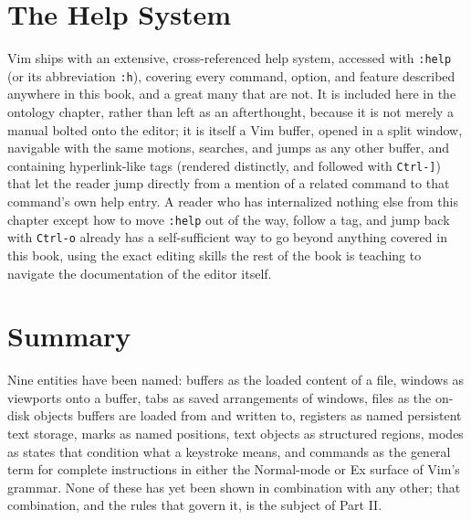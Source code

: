 \section{The Help System}

Vim ships with an extensive, cross-referenced help system, accessed with \texttt{:help} (or its abbreviation \texttt{:h}), covering every command, option, and feature described anywhere in this book, and a great many that are not. It is included here in the ontology chapter, rather than left as an afterthought, because it is not merely a manual bolted onto the editor; it is itself a Vim buffer, opened in a split window, navigable with the same motions, searches, and jumps as any other buffer, and containing hyperlink-like tags (rendered distinctly, and followed with \texttt{Ctrl-]}) that let the reader jump directly from a mention of a related command to that command's own help entry. A reader who has internalized nothing else from this chapter except how to move \texttt{:help} out of the way, follow a tag, and jump back with \texttt{Ctrl-o} already has a self-sufficient way to go beyond anything covered in this book, using the exact editing skills the rest of the book is teaching to navigate the documentation of the editor itself.

\section{Summary}

Nine entities have been named: buffers as the loaded content of a file, windows as viewports onto a buffer, tabs as saved arrangements of windows, files as the on-disk objects buffers are loaded from and written to, registers as named persistent text storage, marks as named positions, text objects as structured regions, modes as states that condition what a keystroke means, and commands as the general term for complete instructions in either the Normal-mode or Ex surface of Vim's grammar. None of these has yet been shown in combination with any other; that combination, and the rules that govern it, is the subject of Part II.

